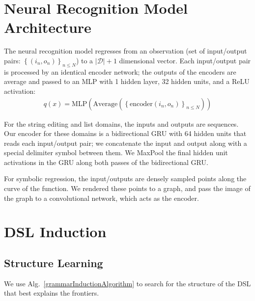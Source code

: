 \documentclass{article}
\begin{document}
\section{Neural Recognition Model Architecture}

The neural recognition model regresses from an observation (set of input/output pairs: $\left\{(i_n,o_n) \right\}_{n\leq N}$) to a $|\mathcal{D}| + 1$ dimensional vector. Each input/output pair is processed by an identical encoder network;
the outputs of the encoders are average and passed to an MLP with 1 hidden layer, 32 hidden units, and a ReLU activation:
\begin{align}
  q(x) = \text{MLP}\left(\text{Average}\left(\left\{\text{encoder}\left(i_n,o_n \right) \right\}_{n\leq N} \right) \right)
\end{align}



For the string editing and list domains,
the inputs and outputs are sequences. Our encoder for these domains is a bidirectional GRU with 64 hidden units that reads each input/output pair; we concatenate the input and output along with a special delimiter
symbol between them.
We MaxPool the final hidden unit activations in the GRU along both passes of the bidirectional GRU.

For symbolic regression,
the input/outputs are densely sampled points along the curve of the function.
We rendered these points to a graph,
and pass the image of the graph to a convolutional network,
which acts as the encoder.

\section{DSL Induction}

\subsection{Structure Learning}

We use Alg.~\ref{grammarInductionAlgorithm} to search for the structure of the DSL that best explains the frontiers.
\end{document}
